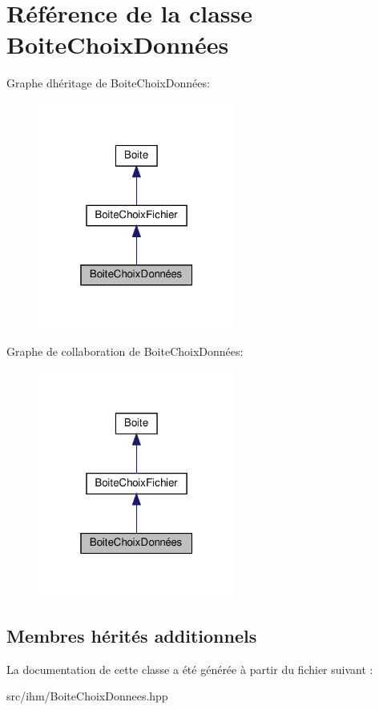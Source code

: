 \hypertarget{classBoiteChoixDonn_xC3_xA9es}{}\section{Référence de la classe Boite\+Choix\+Données}
\label{classBoiteChoixDonn_xC3_xA9es}


Graphe d\textquotesingle{}héritage de Boite\+Choix\+Données\+:
\nopagebreak
\begin{figure}[H]
\begin{center}
\leavevmode
\includegraphics[width=184pt]{classBoiteChoixDonn_xC3_xA9es__inherit__graph}
\end{center}
\end{figure}


Graphe de collaboration de Boite\+Choix\+Données\+:
\nopagebreak
\begin{figure}[H]
\begin{center}
\leavevmode
\includegraphics[width=184pt]{classBoiteChoixDonn_xC3_xA9es__coll__graph}
\end{center}
\end{figure}
\subsection*{Membres hérités additionnels}


La documentation de cette classe a été générée à partir du fichier suivant \+:\begin{DoxyCompactItemize}
\item 
src/ihm/Boite\+Choix\+Donnees.\+hpp\end{DoxyCompactItemize}

